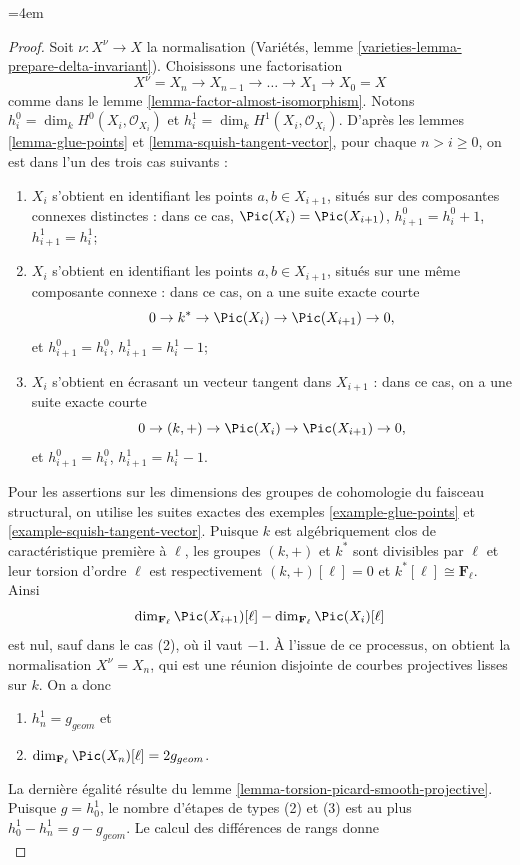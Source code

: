 \begingroup\emergencystretch=4em
\begin{proof}
Soit $\nu : X^\nu \to X$ la normalisation (Variétés, lemme \ref{varieties-lemma-prepare-delta-invariant}). Choisissons une factorisation $$
X^\nu = X_n \to X_{n - 1} \to \ldots \to X_1 \to X_0 = X
$$ comme dans le lemme \ref{lemma-factor-almost-isomorphism}. Notons $h^0_i = \dim_k H^0(X_i, \mathcal{O}_{X_i})$ et $h^1_i = \dim_k H^1(X_i, \mathcal{O}_{X_i})$. D'après les lemmes \ref{lemma-glue-points} et \ref{lemma-squish-tangent-vector}, pour chaque $n > i \geq 0$, on est dans l'un des trois cas suivants : \begin{enumerate} \item $X_i$ s'obtient en identifiant les points $a, b \in X_{i + 1}$, situés sur des composantes connexes distinctes : dans ce cas, $\Pic(X_i) = \Pic(X_{i + 1})$, $h^0_{i + 1} = h^0_i + 1$, $h^1_{i + 1} = h^1_i$; \item $X_i$ s'obtient en identifiant les points $a, b \in X_{i + 1}$, situés sur une même composante connexe : dans ce cas, on a une suite exacte courte $$
0 \to k^* \to \Pic(X_i) \to \Pic(X_{i + 1}) \to 0,
$$ et $h^0_{i + 1} = h^0_i$, $h^1_{i + 1} = h^1_i - 1$; \item $X_i$ s'obtient en écrasant un vecteur tangent dans $X_{i + 1}$ : dans ce cas, on a une suite exacte courte $$
0 \to (k, +) \to \Pic(X_i) \to \Pic(X_{i + 1}) \to 0,
$$ et $h^0_{i + 1} = h^0_i$, $h^1_{i + 1} = h^1_i - 1$. \end{enumerate} Pour les assertions sur les dimensions des groupes de cohomologie du faisceau structural, on utilise les suites exactes des exemples \ref{example-glue-points} et \ref{example-squish-tangent-vector}. Puisque $k$ est algébriquement clos de caractéristique première à $\ell$, les groupes $(k, +)$ et $k^*$ sont divisibles par $\ell$ et leur torsion d'ordre $\ell$ est respectivement $(k, +)[\ell] = 0$ et $k^*[\ell] \cong \mathbf{F}_\ell$. Ainsi $$
\dim_{\mathbf{F}_\ell} \Pic(X_{i + 1})[\ell] -
\dim_{\mathbf{F}_\ell}\Pic(X_i)[\ell]
$$ est nul, sauf dans le cas (2), où il vaut $-1$. À l'issue de ce processus, on obtient la normalisation $X^\nu = X_n$, qui est une réunion disjointe de courbes projectives lisses sur $k$. On a donc \begin{enumerate} \item $h^1_n = g_{geom}$ et \item $\dim_{\mathbf{F}_\ell} \Pic(X_n)[\ell] = 2g_{geom}$. \end{enumerate} La dernière égalité résulte du lemme \ref{lemma-torsion-picard-smooth-projective}. Puisque $g = h^1_0$, le nombre d'étapes de types (2) et (3) est au plus $h^1_0 - h^1_n = g - g_{geom}$. Le calcul des différences de rangs donne $$
$$
\end{proof}
